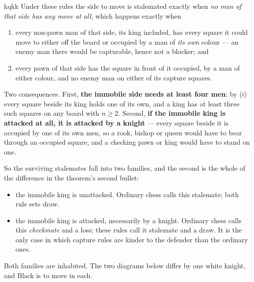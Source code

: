\documentclass[11pt]{article}
\begin{document}
\begin{result}[title={Corollary. The surviving stalemates are exactly the totally immobile positions}]{kqkk}
Under these rules the side to move is stalemated exactly when \emph{no man of
that side has any move at all}, which happens exactly when
\begin{enumerate}\setlength{\itemsep}{1pt}
\item[(i)] every non-pawn man of that side, its king included, has every square
  it could move to either off the board or occupied by a man of \emph{its own}
  colour --- an enemy man there would be capturable, hence not a blocker; and
\item[(ii)] every pawn of that side has the square in front of it occupied, by
  a man of either colour, and no enemy man on either of its capture squares.
\end{enumerate}

\smallskip
Two consequences. First, \textbf{the immobile side needs at least four men}: by
(i) every square beside its king holds one of its own, and a king has at least
three such squares on any board with $n\ge2$. Second, \textbf{if the immobile
king is attacked at all, it is attacked by a knight} --- every square beside it
is occupied by one of its own men, so a rook, bishop or queen would have to
bear through an occupied square, and a checking pawn or king would have to
stand on one.

\smallskip
So the surviving stalemates fall into two families, and the second is the whole
of the difference in the theorem's second bullet:
\begin{itemize}\setlength{\itemsep}{1pt}
\item[\textbf{(S)}] the immobile king is unattacked. Ordinary chess calls this
  stalemate; both rule sets draw.
\item[\textbf{(M)}] the immobile king is attacked, necessarily by a knight.
  Ordinary chess calls this \emph{checkmate} and a loss; these rules call it
  stalemate and a draw. It is the only case in which capture rules are kinder
  to the defender than the ordinary ones.
\end{itemize}
\end{result}

\noindent
Both families are inhabited. The two diagrams below differ by one white knight,
and Black is to move in each.
\end{document}
